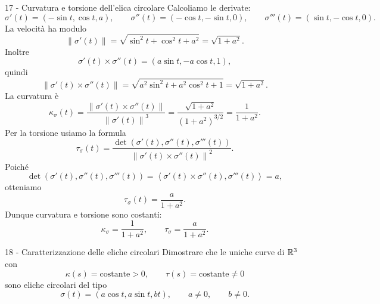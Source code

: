 \documentclass[a4paper]{article}
\begin{document}
\begin{snippetsolution}{17 - Curvatura e torsione dell'elica circolare}
    Calcoliamo le derivate:
    \[
        \sigma'(t)=(-\sin t,\cos t,a),
        \qquad
        \sigma''(t)=(-\cos t,-\sin t,0),
        \qquad
        \sigma'''(t)=(\sin t,-\cos t,0).
    \]
    La velocità ha modulo
    \[
        \left\|\sigma'(t)\right\|
        =
        \sqrt{\sin^2t+\cos^2t+a^2}
        =
        \sqrt{1+a^2}.
    \]
    Inoltre
    \[
        \sigma'(t)\times\sigma''(t)
        =
        \left(
            a\sin t,
            -a\cos t,
            1
        \right),
    \]
    quindi
    \[
        \left\|\sigma'(t)\times\sigma''(t)\right\|
        =
        \sqrt{a^2\sin^2t+a^2\cos^2t+1}
        =
        \sqrt{1+a^2}.
    \]
    La curvatura è
    \[
        \kappa_\sigma(t)
        =
        \frac{\left\|\sigma'(t)\times\sigma''(t)\right\|}{\left\|\sigma'(t)\right\|^3}
        =
        \frac{\sqrt{1+a^2}}{(1+a^2)^{3/2}}
        =
        \frac{1}{1+a^2}.
    \]
    Per la torsione usiamo la formula
    \[
        \tau_\sigma(t)
        =
        \frac{\det(\sigma'(t),\sigma''(t),\sigma'''(t))}{\left\|\sigma'(t)\times\sigma''(t)\right\|^2}.
    \]
    Poiché
    \[
        \det(\sigma'(t),\sigma''(t),\sigma'''(t))
        =
        \left\langle
            \sigma'(t)\times\sigma''(t),
            \sigma'''(t)
        \right\rangle
        =
        a,
    \]
    otteniamo
    \[
        \tau_\sigma(t)
        =
        \frac{a}{1+a^2}.
    \]
    Dunque curvatura e torsione sono costanti:
    \[
        \kappa_\sigma=\frac{1}{1+a^2},
        \qquad
        \tau_\sigma=\frac{a}{1+a^2}.
    \]
\end{snippetsolution}

\begin{snippetexercise}{18 - Caratterizzazione delle eliche circolari}
    Dimostrare che le uniche curve di \(\mathbb{R}^3\) con
    \[
        \kappa(s)=\text{costante}>0,
        \qquad
        \tau(s)=\text{costante}\neq 0
    \]
    sono eliche circolari del tipo
    \[
        \sigma(t)=(a\cos t,a\sin t,bt),
        \qquad
        a\neq 0,
        \qquad
        b\neq 0.
    \]
\end{snippetexercise}
\end{document}
